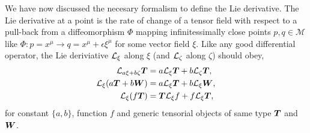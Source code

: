 We have now discussed the necesary formalism to define the Lie derivative. The Lie derivative at a point is the rate of change of a tensor field with respect to a pull-back from a diffeomorphism $\Phi$ mapping infinitessimally close points $p,q \in \mathcal{M}$ like $\Phi:p=x^\mu \rightarrow q = x^\mu+\epsilon \xi^\mu$ for some vector field $\xi$. Like any good differential operator, the Lie deriviative $\mathcal{L}_\xi$ along $\xi$ (and $\mathcal{L}_\zeta$ along $\zeta$) should obey,
\begin{align}
\mathcal{L}_{a \xi + b \zeta}\boldsymbol{T}  &= a \mathcal{L}_\xi\boldsymbol{T}  + b \mathcal{L}_\zeta\boldsymbol{T} ,\\
\mathcal{L}_\xi (a \boldsymbol{T} + b \boldsymbol{W}) & = a \mathcal{L}_\xi \boldsymbol{T} + b \mathcal{L}_\xi \boldsymbol{W} , \\
\mathcal{L}_\xi (f \boldsymbol{T} ) &= \boldsymbol{T} \mathcal{L}_\xi f + f \mathcal{L}_\xi \boldsymbol{T} \label{intro:eq:lie_liebnitz},
\end{align}
for constant $\{a,b\}$, function $f$ and generic tensorial objects of same type $\boldsymbol{T}$ and $\boldsymbol{W}$. 

